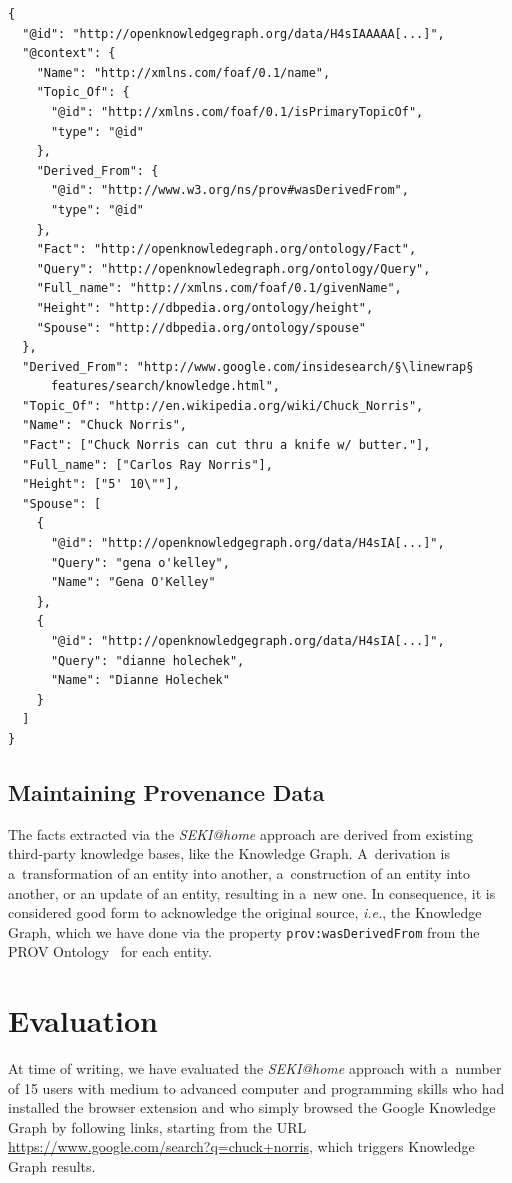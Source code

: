 \documentclass[runningheads,a4paper]{llncs}
\newcommand{\linewrap}{\raisebox{-.6ex}{\textcolor{grey}{$\hookleftarrow$}}}
\begin{document}
\begin{lstlisting}[caption=Subset of the meaningful JSON-LD from the Chuck Norris Knowledge Graph data. The mapping of the Knowledge Graph terms can be seen in the @context., label=code:jsonld, float=hbt!, escapechar=§, belowskip=-1em]
{
  "@id": "http://openknowledgegraph.org/data/H4sIAAAAA[...]",
  "@context": {
    "Name": "http://xmlns.com/foaf/0.1/name",
    "Topic_Of": {
      "@id": "http://xmlns.com/foaf/0.1/isPrimaryTopicOf",
      "type": "@id"
    },
    "Derived_From": {
      "@id": "http://www.w3.org/ns/prov#wasDerivedFrom",
      "type": "@id"
    },
    "Fact": "http://openknowledegraph.org/ontology/Fact",
    "Query": "http://openknowledegraph.org/ontology/Query",
    "Full_name": "http://xmlns.com/foaf/0.1/givenName",
    "Height": "http://dbpedia.org/ontology/height",
    "Spouse": "http://dbpedia.org/ontology/spouse"
  },
  "Derived_From": "http://www.google.com/insidesearch/§\linewrap§
      features/search/knowledge.html",
  "Topic_Of": "http://en.wikipedia.org/wiki/Chuck_Norris",
  "Name": "Chuck Norris",
  "Fact": ["Chuck Norris can cut thru a knife w/ butter."],
  "Full_name": ["Carlos Ray Norris"],
  "Height": ["5' 10\""],
  "Spouse": [
    {
      "@id": "http://openknowledgegraph.org/data/H4sIA[...]",
      "Query": "gena o'kelley",
      "Name": "Gena O'Kelley"
    },
    {
      "@id": "http://openknowledgegraph.org/data/H4sIA[...]",
      "Query": "dianne holechek",
      "Name": "Dianne Holechek"
    }
  ]
}
\end{lstlisting} 

\subsection{Maintaining Provenance Data}
The facts extracted via the \emph{SEKI@home} approach
are derived from existing third-party knowledge bases, like the Knowledge Graph.
A~derivation is a~transformation of an entity into another,
a~construction of an entity into another, or an update of an entity,
resulting in a~new one.
In consequence, it is considered good form to acknowledge the original source,
\emph{i.e.}, the Knowledge Graph,
which we have done via the property \texttt{prov:wasDerivedFrom}
from the PROV Ontology~\cite{lebo2012} for each entity.

\section{Evaluation} \label{sec:evaluation}
At time of writing, we have evaluated the \emph{SEKI@home} approach
with a~number of 15 users
with medium to advanced computer and programming skills
who had installed the browser extension
and who simply browsed the Google Knowledge Graph by following links,
starting from the URL \url{https://www.google.com/search?q=chuck+norris},
which triggers Knowledge Graph results.
\end{document}
